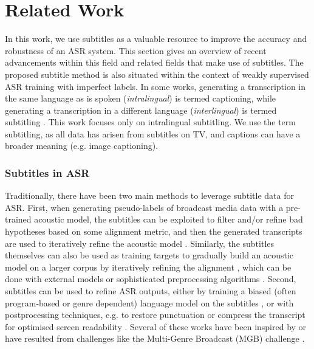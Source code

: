 \section{Related Work}
\label{sec:relatedwork}
\noindent In this work, we use subtitles as a valuable resource to improve the accuracy and robustness of an ASR system. This section gives an overview of recent advancements within this field and related fields that make use of subtitles. The proposed subtitle method is also situated within the context of weakly supervised ASR training with imperfect labels. In some works, generating a transcription in the same language as is spoken (\textit{intralingual}) is termed captioning, while generating a transcription in a different language (\textit{interlingual}) is termed subtitling \cite{xu-etal-2022-joint}. This work focuses only on intralingual subtitling. We use the term subtitling, as all data has arisen from subtitles on TV, and captions can have a broader meaning (e.g. image captioning).

\subsubsection{Subtitles in ASR}
\noindent Traditionally, there have been two main methods to leverage subtitle data for ASR. First, when generating pseudo-labels of broadcast media data with a pre-trained acoustic model, the subtitles can be exploited to filter and/or refine bad hypotheses based on some alignment metric, and then the generated transcripts are used to iteratively refine the acoustic model \cite{lamel_2002, lanchantin16_interspeech, BangIEICE}. Similarly, the subtitles themselves can also be used as training targets to gradually build an acoustic model on a larger corpus by iteratively refining the alignment \cite{Ando2021ConstructionOA, reazonspeech}, which can be done with external models \cite{bell15_ASRU, Saz2018, JHU_kaldi} or sophisticated preprocessing algorithms \cite{BangIEICE}. Second, subtitles can be used to refine ASR outputs, either by training a biased (often program-based or genre dependent) language model on the subtitles \cite{lamel_2002, BangIEICE, vishwa2015}, or with postprocessing techniques, e.g. to restore punctuation \cite{Guerreiro21eswa, geislinger-etal-2022-improved, Milde2021_1109} or compress the transcript for optimised screen readability \cite{liu-etal-2020-adapting}. Several of these works have been inspired by or have resulted from challenges like the Multi-Genre Broadcast (MGB) challenge \cite{MGB1, MGB2, iberspeech}.

